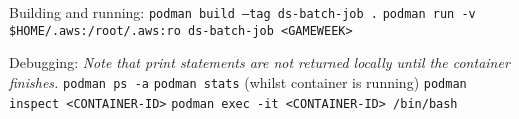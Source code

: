 Building and running:\newline
\texttt{podman build --tag ds-batch-job .}\newline
\texttt{podman run  -v \$HOME/.aws:/root/.aws:ro ds-batch-job <GAMEWEEK>}

Debugging:\newline
\textit{Note that print statements are not returned locally until the container finishes.}\newline
\texttt{podman ps -a}\newline
\texttt{podman stats} (whilst container is running)\newline
\texttt{podman inspect <CONTAINER-ID>}\newline
\texttt{podman exec -it <CONTAINER-ID> /bin/bash}\newline

\newpage